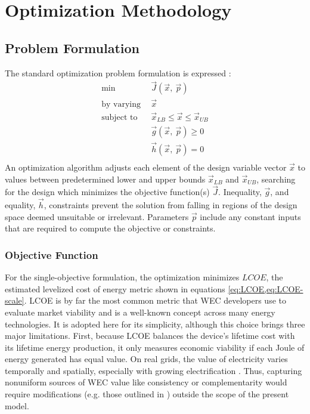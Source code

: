 \section{Optimization Methodology}\label{sec:optim-methods}
\subsection{Problem Formulation}\label{sec:formulation}
The standard optimization problem formulation is expressed \cite{martins_engineering_2022,papalambros_principles_2017}:
\begin{equation}
\begin{aligned}
    \text{min}~~& \vec{J}(\vec{x},~\vec{p}) \\
    \text{by varying}~~&\vec{x} \\
    \text{subject to}~~ &\vec{x}_{LB} \leq \vec{x} \leq \vec{x}_{UB} \\
    &\vec{g}(\vec{x},~\vec{p}) \geq 0\\
    &\vec{h}(\vec{x},~\vec{p})= 0\\
\label{standard}
\end{aligned}
\end{equation}
An optimization algorithm adjusts each element of the design variable vector $\vec{x}$ to values between predetermined lower and upper bounds $\vec{x}_{LB}$ and $\vec{x}_{UB}$, searching for the design which minimizes the objective function(s) $\vec{J}$. Inequality, $\vec{g}$, and equality, $\vec{h}$, constraints prevent the solution from falling in regions of the design space deemed unsuitable or irrelevant. Parameters $\vec{p}$ include any constant inputs that are required to compute the objective or constraints.

\subsubsection{Objective Function}\label{sec:obj}
For the single-objective formulation, the optimization minimizes $LCOE$, the estimated levelized cost of energy metric shown in equations \eqref{eq:LCOE,eq:LCOE-scale}. LCOE is by far the most common metric that WEC developers use to evaluate market viability \cite{trueworthy_wave_2020} and is a well-known concept across many energy technologies. It is adopted here for its simplicity, although this choice brings three major limitations. First, because LCOE balances the device's lifetime cost with its lifetime energy production, it only measures economic viability if each Joule of energy generated has equal value. On real grids, the value of electricity varies temporally and spatially, especially with growing electrification \cite{akdemir_opportunities_2023,bhattacharya_timing_2021,pennock_temporal_2022}. Thus, capturing nonuniform sources of WEC value like consistency or complementarity would require modifications (e.g. those outlined in \cite{mccabe_system_2023}) outside the scope of the present model.

